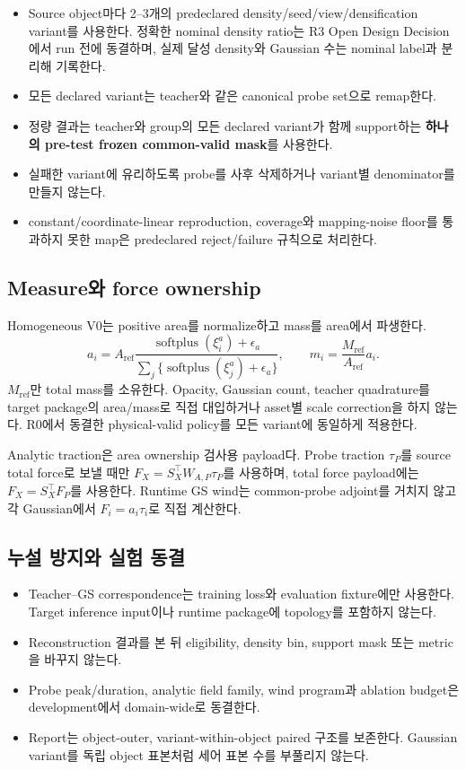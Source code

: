 \documentclass[10pt,a4paper]{article}
\begin{document}
\begin{itemize}
  \item Source object마다 2--3개의 predeclared density/seed/view/densification variant를 사용한다.
  정확한 nominal density ratio는 R3 Open Design Decision에서 run 전에 동결하며,
  실제 달성 density와 Gaussian 수는 nominal label과 분리해 기록한다.
  \item 모든 declared variant는 teacher와 같은 canonical probe set으로 remap한다.
  \item 정량 결과는 teacher와 group의 모든 declared variant가 함께 support하는
  \textbf{하나의 pre-test frozen common-valid mask}를 사용한다.
  \item 실패한 variant에 유리하도록 probe를 사후 삭제하거나 variant별 denominator를 만들지 않는다.
  \item constant/coordinate-linear reproduction, coverage와 mapping-noise floor를 통과하지 못한 map은
  predeclared reject/failure 규칙으로 처리한다.
\end{itemize}

\subsection{Measure와 force ownership}

Homogeneous V0는 positive area를 normalize하고 mass를 area에서 파생한다.
\[
  a_i=A_{\mathrm{ref}}
  \frac{\operatorname{softplus}(\xi_i^a)+\epsilon_a}
       {\sum_j\{\operatorname{softplus}(\xi_j^a)+\epsilon_a\}},
  \qquad
  m_i=\frac{M_{\mathrm{ref}}}{A_{\mathrm{ref}}}a_i.
\]
\(M_{\mathrm{ref}}\)만 total mass를 소유한다. Opacity, Gaussian count, teacher quadrature를
target package의 area/mass로 직접 대입하거나 asset별 scale correction을 하지 않는다.
R0에서 동결한 physical-valid policy를 모든 variant에 동일하게 적용한다.

Analytic traction은 area ownership 검사용 payload다. Probe traction \(\tau_P\)를 source total force로
보낼 때만 \(F_X=S_X^\top W_{A,P}\tau_P\)를 사용하며, total force payload에는
\(F_X=S_X^\top F_P\)를 사용한다. Runtime GS wind는 common-probe adjoint를 거치지 않고
각 Gaussian에서 \(F_i=a_i\tau_i\)로 직접 계산한다.

\subsection{누설 방지와 실험 동결}

\begin{itemize}
  \item Teacher--GS correspondence는 training loss와 evaluation fixture에만 사용한다.
  Target inference input이나 runtime package에 topology를 포함하지 않는다.
  \item Reconstruction 결과를 본 뒤 eligibility, density bin, support mask 또는 metric을 바꾸지 않는다.
  \item Probe peak/duration, analytic field family, wind program과 ablation budget은 development에서
  domain-wide로 동결한다.
  \item Report는 object-outer, variant-within-object paired 구조를 보존한다.
  Gaussian variant를 독립 object 표본처럼 세어 표본 수를 부풀리지 않는다.
\end{itemize}
\end{document}

